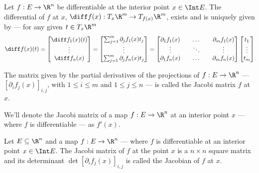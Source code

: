 \begin{corollary}
  \label{cor: several-differential}
  Let \(f: E \to \R^n\) be differentiable at the interior point \(x \in \Int
  E\). The differential of \(f\) at \(x\), \(\diff f(x): T_x\R^m \to
  T_{f(x)}\R^m\), exists and is uniquely given by --- for any given \(t \in
  T_x\R^m\)
  \begin{equation}\label{eq: several-differential}
    \diff f(x)(t) =
    \begin{bmatrix}
      \diff f_1(x)(t) \\ \vdots \\ \diff f_n(x)
    \end{bmatrix}
    =
    \begin{bmatrix}
      \sum_{j=1}^m \partial_j f_1(x) t_j
      \\ \vdots \\
      \sum_{j=1}^m \partial_j f_n(x) t_j
    \end{bmatrix}
    =
    \begin{bmatrix}
      \partial_1 f_1(x) && \dots && \partial_m f_1(x) \\
      \vdots && \ddots && \vdots \\
      \partial_1 f_n(x) && \dots && \partial_m f_n(x)
    \end{bmatrix}
    \begin{bmatrix}
      t_1 \\ \vdots \\ t_m
    \end{bmatrix}
  \end{equation}
\end{corollary}

\begin{definition}\label{def: jacobi-matrix}
  The matrix given by the partial derivatives of the projections of \(f: E \to
  \R^n\) --- \([\partial_i f_j(x)]_{i, j}\), with \(1 \leq i \leq m\) and \(1
  \leq j \leq n\) --- is called the Jacobi matrix \(f\) at \(x\).
\end{definition}

\begin{notation}
  We'll denote the Jacobi matrix of a map \(f: E \to \R^n\) at an interior point
  \(x\) --- where \(f\) is differentiable --- as \(f'(x)\).
\end{notation}

\begin{definition}[Jacobian]\label{def: jacobian}
  Let \(E \subseteq \R^n\) and a map \(f: E \to \R^n\) --- where \(f\) is
  differentiable at an interior point \(x \in \Int E\). The Jacobi matrix of
  \(f\) at the point \(x\) is a \(n \times n\) square matrix and its determinant
  \(\det [\partial_i f_j(x)]_{i, j}\) is called the Jacobian of \(f\) at \(x\).
\end{definition}

